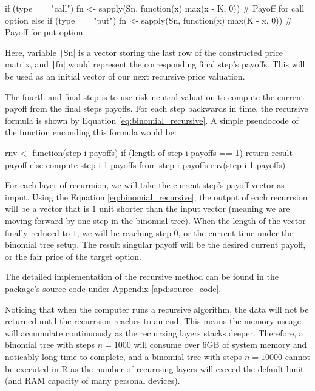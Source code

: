 \begin{Rminted}
if (type == "call") {
    fn <- sapply(Sn, function(x) {max(x - K, 0)}) # Payoff for call option
} else if (type == "put") {
    fn <- sapply(Sn, function(x) {max(K - x, 0)}) # Payoff for put option
}
\end{Rminted}

Here, variable \texttt|Sn| is a vector storing the last row of the constructed price matrix, and \texttt|fn| would represent the corresponding final step's payoffs. This will be used as an initial vector of our next recursive price valuation.

The fourth and final step is to use risk-neutral valuation to compute the current payoff from the final steps payoffs. For each step backwards in time, the recursive formula is shown by Equation \ref{eq:binomial_recursive}. A simple pseudocode of the function enconding this formula would be:

rnv <- function(step i payoffs) {
    if (length of step i payoffs == 1) {
        return result payoff
    } else {
        compute step i-1 payoffs from step i payoffs
        rnv(step i-1 payoffs)
    }
}

For each layer of recurrsion, we will take the current step's payoff vector as imput. Using the Equation \ref{eq:binomial_recursive}, the output of each recurrsion will be a vector that is $1$ unit shorter than the input vector (meaning we are moving forward by one step in the binomial tree). When the length of the vector finally reduced to $1$, we will be reaching step $0$, or the current time under the binomial tree setup. The result singular payoff will be the desired current payoff, or the fair price of the target option.

The detailed implementation of the recursive method can be found in the package's source code under Appendix \ref{apd:source_code}.

Noticing that when the computer runs a recursive algorithm, the data will not be returned until the recurrsion reaches to an end. This means the memory useage will accumulate continuously as the recurrsing layers stacks deeper. Therefore, a binomial tree with steps $n=1000$ will consume over 6GB of system memory and noticably long time to complete, and a binomial tree with steps $n=10000$ cannot be executed in R as the number of recurrsing layers will exceed the default limit (and RAM capacity of many personal devices).

